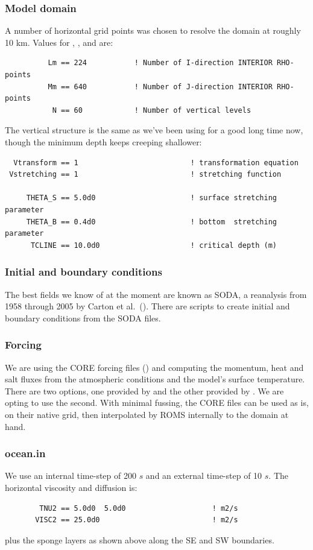 \subsubsection{Model domain}
A number of horizontal grid points was chosen to resolve the
domain at roughly 10 km. Values for , , and
 are:
\begin{verbatim}
          Lm == 224           ! Number of I-direction INTERIOR RHO-points
          Mm == 640           ! Number of J-direction INTERIOR RHO-points
           N == 60            ! Number of vertical levels
\end{verbatim}
The vertical structure is the same as we've been using for a good
long time now, though the minimum depth keeps creeping shallower:
\begin{verbatim}
  Vtransform == 1                          ! transformation equation
 Vstretching == 1                          ! stretching function

     THETA_S == 5.0d0                      ! surface stretching parameter
     THETA_B == 0.4d0                      ! bottom  stretching parameter
      TCLINE == 10.0d0                     ! critical depth (m)
\end{verbatim}

\subsubsection{Initial and boundary conditions}
The best fields we know of at the moment are known as SODA, a
reanalysis from 1958 through 2005 by Carton et al.\
(\cite{Carton_2005}). There are  scripts to create
initial and boundary conditions from the SODA files.

\subsubsection{Forcing}
We are using the CORE forcing files (\cite{Large_08}) and computing the
momentum, heat and salt fluxes from the atmospheric conditions and the
model's surface temperature. There are two options, one provided by
\code{bulk\_flux.F} and the other provided by \code{ccsm\_flux.F}. We
are opting to use the second. With minimal fussing, the CORE files
can be used as is, on their native grid, then interpolated by ROMS
internally to the domain at hand.

\subsubsection{ocean.in}
We use an internal time-step of 200 $s$ and an external time-step of 10
$s$. The horizontal viscosity and diffusion is:
\begin{verbatim}
        TNU2 == 5.0d0  5.0d0                    ! m2/s
       VISC2 == 25.0d0                          ! m2/s
\end{verbatim}
plus the sponge layers as shown above along the SE and SW boundaries.

